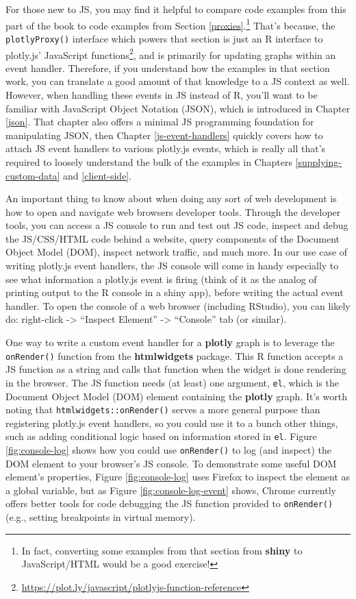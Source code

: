 \documentclass[
  12pt,
]{krantz}
\renewcommand{\href}[2]{#2\footnote{\url{#1}}}
\begin{document}
For those new to JS, you may find it helpful to compare code examples from this part of the book to code examples from Section \ref{proxies}.\footnote{In fact, converting some examples from that section from \textbf{shiny} to JavaScript/HTML would be a good exercise!} That's because, the \texttt{plotlyProxy()} interface which powers that section is just an R interface to \href{https://plot.ly/javascript/plotlyjs-function-reference}{plotly.js' JavaScript functions}, and is primarily for updating graphs within an event handler. Therefore, if you understand how the examples in that section work, you can translate a good amount of that knowledge to a JS context as well.
However, when handling these events in JS instead of R, you'll want to be familiar with JavaScript Object Notation (JSON), which is introduced in Chapter \ref{json}. That chapter also offers a minimal JS programming foundation for manipulating JSON, then Chapter \ref{js-event-handlers} quickly covers how to attach JS event handlers to various plotly.js events, which is really all that's required to loosely understand the bulk of the examples in Chapters \ref{supplying-custom-data} and \ref{client-side}.

An important thing to know about when doing any sort of web development is how to open and navigate web browsers developer tools. Through the developer tools, you can access a JS console to run and test out JS code, inspect and debug the JS/CSS/HTML code behind a website, query components of the Document Object Model (DOM), inspect network traffic, and much more. In our use case of writing plotly.js event handlers, the JS console will come in handy especially to see what information a plotly.js event is firing (think of it as the analog of printing output to the R console in a shiny app), before writing the actual event handler. To open the console of a web browser (including RStudio), you can likely do: right-click -\textgreater{} ``Inspect Element'' -\textgreater{} ``Console'' tab (or similar).


One way to write a custom event handler for a \textbf{plotly} graph is to leverage the \texttt{onRender()} function from the \textbf{htmlwidgets} package. This R function accepts a JS function as a string and calls that function when the widget is done rendering in the browser. The JS function needs (at least) one argument, \texttt{el}, which is the Document Object Model (DOM) element containing the \textbf{plotly} graph. It's worth noting that \texttt{htmlwidgets::onRender()} serves a more general purpose than registering plotly.js event handlers, so you could use it to a bunch other things, such as adding conditional logic based on information stored in \texttt{el}. Figure \ref{fig:console-log} shows how you could use \texttt{onRender()} to log (and inspect) the DOM element to your browser's JS console. To demonstrate some useful DOM element's properties, Figure \ref{fig:console-log} uses Firefox to inspect the element as a global variable, but as Figure \ref{fig:console-log-event} shows, Chrome currently offers better tools for code debugging the JS function provided to \texttt{onRender()} (e.g., setting breakpoints in virtual memory).
\end{document}
